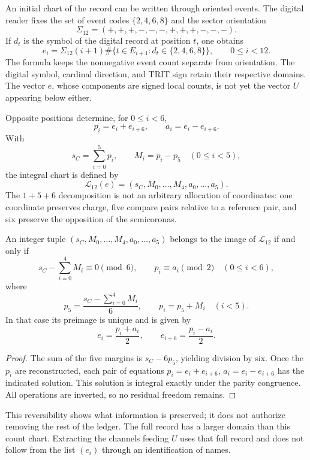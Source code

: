 An initial chart of the record can be written through oriented
events. The digital reader fixes the set of event codes
\(\{2,4,6,8\}\) and the sector orientation
\[
 \Sigma_{12}=(+,+,+,-,-,-,+,+,+,-,-,-).
\]
If \(d_t\) is the symbol of the digital record at position \(t\), one obtains
\[
 e_i=\Sigma_{12}(i+1)
 \#\{t\in E_{i+1}:d_t\in\{2,4,6,8\}\},
 \qquad0\leq i<12.
\]
The formula keeps the nonnegative event count separate from
orientation. The digital symbol, cardinal direction, and TRIT sign
retain their respective domains. The
vector \(e\), whose components are signed local counts, is not yet
the vector \(U\) appearing below either.

Opposite positions determine, for \(0\leq i<6\),
\[
 p_i=e_i+e_{i+6},\qquad a_i=e_i-e_{i+6}.
\]
With
\[
 s_C=\sum_{i=0}^{5}p_i,\qquad M_i=p_i-p_5\quad(0\leq i<5),
\]
the integral chart is defined by
\[
 \mathcal L_{12}(e)
 =(s_C,M_0,\ldots,M_4,a_0,\ldots,a_5).
\]
The \(1+5+6\) decomposition is not an arbitrary allocation of coordinates:
one coordinate preserves charge, five compare pairs relative to a
reference pair, and six preserve the opposition of the semicoronas.

\begin{lemma}
\label{lem:k-carta-integral}
An integer tuple \((s_C,M_0,\ldots,M_4,a_0,\ldots,a_5)\) belongs to the
image of \(\mathcal L_{12}\) if and only if
\[
 s_C-\sum_{i=0}^{4}M_i\equiv0\pmod6,
 \qquad p_i\equiv a_i\pmod2\quad(0\leq i<6),
\]
where
\[
 p_5=\frac{s_C-\sum_{i=0}^{4}M_i}{6},\qquad p_i=p_5+M_i\quad(i<5).
\]
In that case its preimage is unique and is given by
\[
 e_i=\frac{p_i+a_i}{2},\qquad e_{i+6}=\frac{p_i-a_i}{2}.
\]
\end{lemma}

\begin{proof}
The sum of the five margins is \(s_C-6p_5\), yielding
division by six. Once the \(p_i\) are reconstructed, each pair of equations
\(p_i=e_i+e_{i+6}\), \(a_i=e_i-e_{i+6}\) has the indicated solution.
This solution is integral exactly under the parity congruence. All
operations are inverted, so no residual freedom remains.
\end{proof}

This reversibility shows what information is preserved; it does not authorize
removing the rest of the ledger. The full record has a larger domain
than this count chart. Extracting the channels feeding
\(U\) uses that full record and does not follow from the list
\((e_i)\) through an identification of names.

